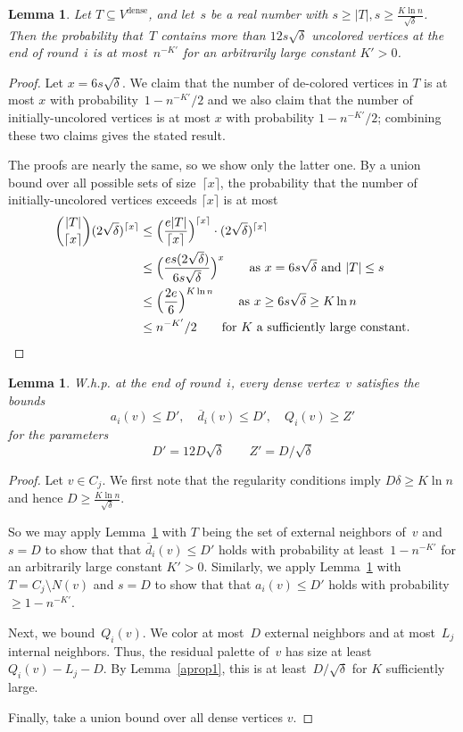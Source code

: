 \documentclass[11pt]{amsart}
\newtheorem{lemma}[theorem]{Lemma}
\newcommand{\extd}{\ensuremath{{\overline{d}}}}
\begin{document}
\begin{lemma}
\label{prop3}
Let $T \subseteq V^{\text{dense}}$, and let~$s$ be a real number with $s \geq |T|, s \geq \frac{K \ln n}{\sqrt{\delta}}$. Then the probability that~$T$ contains more than $12 s \sqrt{\delta}$ uncolored vertices at the end of round~$i$ is at most~$n^{-K'}$ for an arbitrarily large constant $K'>0$.
\end{lemma}
\begin{proof}
Let $x = 6 s \sqrt{\delta}$. We claim that the number of de-colored vertices in $T$ is at most $x$ with probability~$1 - n^{-K'}/2$ and we also claim that the number of initially-uncolored vertices is at most $x$ with probability $1 - n^{-K'}/2$; combining these two claims gives the stated result.

The proofs are nearly the same, so we show only the latter one. By a union bound over all possible sets of size~$\lceil x \rceil$, the probability that the number of initially-uncolored vertices exceeds $\lceil x \rceil$ is at most
{\allowdisplaybreaks
\begin{align*}
\binom{|T|}{\lceil x \rceil} (2 \sqrt{\delta})^{\lceil x \rceil} &\leq \Bigl( \frac{e|T|}{\lceil x \rceil} \Bigr)^{\lceil x \rceil} \cdot (2 \sqrt{\delta})^{\lceil x \rceil} \\
&\leq \Bigl( \frac{e s (2 \sqrt{\delta})}{6 s \sqrt{\delta}} \Bigr)^{x} \qquad \text{as $x = 6 s\sqrt{\delta}$ and $|T| \leq s$}\\
&\leq \Bigl( \frac{2e}{6} \Bigr)^{K \ln n} \qquad \text{as $x \geq 6 s \sqrt{\delta} \geq K \ln n$} \\
&\leq n^{-K'}/2 \qquad \text{for $K$ a sufficiently large constant.}
\end{align*}
}
\end{proof}

\begin{lemma}
\label{r-prop1}
W.h.p. at the end of round~$i$, every dense vertex~$v$ satisfies the bounds
$$
a_i(v) \leq  D',\quad \extd_i(v) \leq D',\quad Q_i(v)  \geq Z'
$$
for the parameters
$$
D' = 12 D \sqrt{\delta} \qquad Z' = D/\sqrt{\delta}
$$
\end{lemma}
\begin{proof}
Let $v \in C_j$. We first note that the regularity conditions imply $D \delta \geq K \ln n$ and hence $D \geq \frac{K \ln n}{\sqrt{\delta}}$.

So we may apply Lemma~\ref{prop3} with $T$ being the set of external neighbors of~$v$ and $s = D$ to show that that $\extd_i(v) \leq D'$ holds with probability at least~$1 - n^{-K'}$ for an arbitrarily large constant $K'>0$. Similarly, we apply Lemma~\ref{prop3} with $T = C_j \setminus N(v)$ and $s = D$ to show that that $a_i(v) \leq D'$ holds with probability~$\geq 1 - n^{-K'}$.  

Next, we bound~$Q_i(v)$. We color at most~$D$ external neighbors and at most~$L_j$ internal neighbors. Thus, the residual palette of~$v$ has size at least~$Q_i(v) - L_j - D$. By Lemma~\ref{aprop1}, this is at least~$D/\sqrt{\delta}$ for $K$ sufficiently large.

Finally, take a union bound over all dense vertices $v$.
\end{proof}
\end{document}
